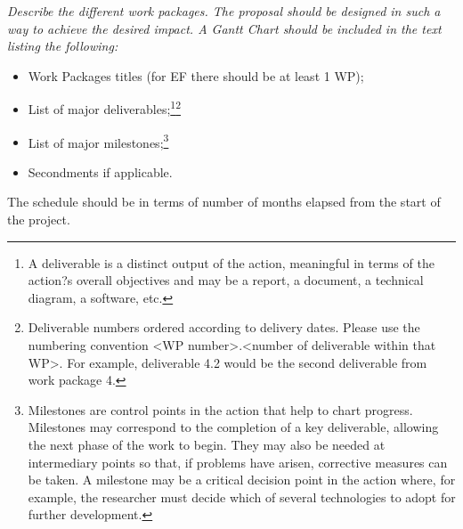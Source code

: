 \documentclass[a4paper,11pt]{article}
\begin{document}
{\em
Describe the different work packages. The proposal should be designed in such a way to achieve the desired impact. A Gantt Chart should be included in the text listing the following:
\begin{itemize}
\item Work Packages titles (for EF there should be at least 1 WP);
\item List of major deliverables;\footnote{A deliverable is a distinct output of the action, meaningful in terms of the action?s overall objectives and may be a report, a document, a technical diagram, a software, etc.}\footnote{Deliverable numbers ordered according to delivery dates. Please use the numbering convention <WP number>.<number of deliverable within that WP>. For example, deliverable 4.2 would be the second deliverable from work package 4.}
\item List of major milestones;\footnote{Milestones are control points in the action that help to chart progress. Milestones may correspond to the completion of a key deliverable, allowing the next phase of the work to begin. They may also be needed at intermediary points so that, if problems have arisen, corrective measures can be taken. A milestone may be a critical decision point in the action where, for example, the researcher must decide which of several technologies to adopt for further development.}
\item Secondments if applicable.
\end{itemize}
The schedule should be in terms of number of months elapsed from the start of the project.
}
\end{document}

